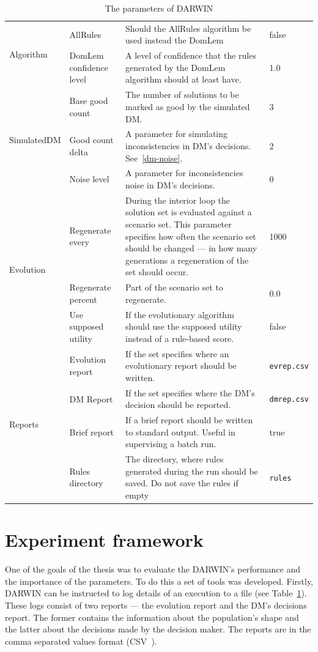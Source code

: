 \begin{table}
\begin{tabular}{l l p{7cm} l}
    \hline 
    \multirow{2}{*}{Algorithm} & AllRules & Should the AllRules algorithm be
    used instead the  DomLem& false \\
    & DomLem confidence level & A level of
    confidence that the rules generated by the
    DomLem algorithm should at least have. & 1.0 \\
    \hline
    \multirow{3}{*}{SimulatedDM} & Base good count & The number of solutions to be marked
    as good by the simulated DM. & 3 \\
    & Good count delta & A parameter for simulating inconsistencies in DM's decisions. See~\ref{dm-noise}. & 2 \\
    & Noise level & A parameter for inconsistencies noise in DM's decisions. & 0 \\
    \hline
    \multirow{3}{*}{Evolution} & Regenerate every & During the interior loop
    the solution set is evaluated against a scenario set. This parameter
    specifies how often the scenario set should be changed --- in how many
    generations a regeneration of the set should occur. & 1000 \\
    & Regenerate percent & Part of the scenario set to regenerate. & 0.0 \\
    & Use supposed utility & If the evolutionary algorithm should use the
    supposed utility instead of a rule-based score. & false \\
    \hline
    \multirow{4}{*}{Reports} & Evolution report & If the set specifies where an
    evolutionary report should be written.  & \texttt{evrep.csv} \\
    & DM Report & If the set specifies where the DM's decision should be reported. & \texttt{dmrep.csv} \\
    &  Brief report & If a brief report should be written to standard
    output. Useful in supervising a batch run. & true \\
    & Rules directory & The directory, where rules generated during the run
    should be saved. Do not save the rules if empty & \texttt{rules} \\
    \hline
  \end{tabular}
  \caption{The parameters of DARWIN}
  \label{t:params}
\end{table}


\section{Experiment framework}
One of the goals of the thesis was to evaluate the DARWIN's performance and
the importance of the parameters. To do this a set of tools was
developed. Firstly, DARWIN can be instructed to log details of an execution to
a file (see Table~\ref{t:params}). These logs consist of two reports --- the
evolution report and the DM's decisions report. The former contains the
information about the population's shape and the latter about the decisions
made by the decision maker. The reports are in the comma separated values
format (CSV~\cite{RFC4180}).

